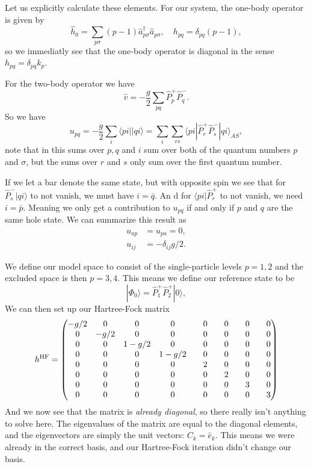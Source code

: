 \documentclass[a4paper, 11pt, notitlepage, english]{article}
\newcommand{\bra}[1]{\langle #1|}
\newcommand{\ket}[1]{|#1 \rangle}
\newcommand{\brakket}[2]{\langle #1 || #2 \rangle}
\newcommand{\op}[1]{\hat{#1}}
\newcommand{\braopket}[3]{\langle #1 | {#2} | #3 \rangle}
\begin{document}
Let us explicitly calculate these elements. For our system, the one-body operator is given by
$$\op{h}_0 = \sum_{p\sigma} (p-1)\op{a}_{p\sigma}^\dagger \op{a}_{p\sigma}, \quad h_{pq} = \delta_{pq} (p-1),$$
so we immediatly see that the one-body operator is diagonal in the sense $h_{pq} = \delta_{pq} k_p$.

For the two-body operator we have 
$$\op{v} = -\frac{g}{2}\sum_{pq}\op{P}_{p}^+ \op{P}_{q}^-.$$
So we have
$$u_{pq} = -\frac{g}{2} \sum_{i} \brakket{pi}{qi} = \sum_i\sum_{rs} \braopket{pi}{\op{P}_{r}^+ \op{P}_{s}^-}{qi}_{AS},$$
note that in this sums over $p, q$ and $i$ sum over both of the quantum numbers $p$ and $\sigma$, but the sums over $r$ and $s$ only sum over the first quantum number.

If we let a bar denote the same state, but with opposite spin we see that for $\op{P}^-_s\ket{q i}$ to 
not vanish, we must have $i=\bar{q}$. An
d for $\bra{pi}\op{P}^+_r$ to not vanish, we
 need $i=\bar{p}$. Meaning we only get a contribution to $u_{pq}$ if and only if $p$ and $q$ are the same hole state. We can summarize this result as
\begin{align*}
u_{ap} &= u_{pa} = 0, \\
u_{ij} &= -\delta_{ij} g/2.
\end{align*}


We define our model space to consist of the single-particle levels $p=1,2$ and the excluded space is then $p=3,4$. This means we define our reference state to be
$$\ket{\Phi_0} = \op{P}_1^+ \op{P}_2^+ \ket{0},$$
We can then set up our Hartree-Fock matrix
\begin{align*}
h^{\rm HF} = 
\begin{pmatrix}
-g/2 & 0 & 0 & 0 & \quad 0 & \quad 0 & \quad 0 & \quad 0 \\
0 & -g/2  & 0 & 0 & \quad 0 & \quad 0 & \quad 0 & \quad 0 \\
0 & 0 & 1-g/2 & 0 & \quad 0 & \quad 0 & \quad 0 & \quad 0 \\
0 & 0 & 0 & 1-g/2 & \quad 0 & \quad 0 & \quad 0 & \quad 0 \\
0 & 0 & 0 & 0 & \quad 2 & \quad 0 & \quad 0 & \quad 0 \\
0 & 0 & 0 & 0 & \quad 0 & \quad 2 & \quad 0 & \quad 0 \\
0 & 0 & 0 & 0 & \quad 0 & \quad 0 & \quad 3 & \quad 0 \\
0 & 0 & 0 & 0 & \quad 0 & \quad 0 & \quad 0 & \quad 3 \\
\end{pmatrix}
\end{align*}
And we now see that the matrix is \emph{already diagonal}, so there really isn't anything to solve here. The eigenvalues of the matrix are equal to the diagonal elements, and the eigenvectors are simply the unit vectors: $C_k = \hat{e}_k$. This means we were already in the correct basis, and our Hartree-Fock iteration didn't change our basis.
\end{document}
